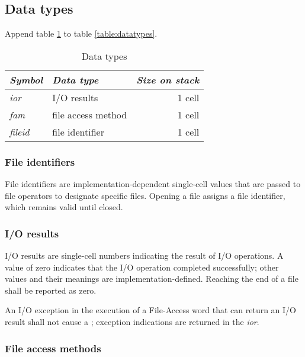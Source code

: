 \subsection{Data types} %

Append table \ref{file:types} to table \ref{table:datatypes}.

\begin{table}[h]
  \begin{center}
	\caption{Data types}
	\label{file:types}
	\begin{tabular}{llr}
	\hline\hline
	\emph{Symbol} & \emph{Data type} & \emph{Size on stack} \\
	\hline
	\emph{ior}		& I/O results			& 1 cell \\
	\emph{fam}		& file access method	& 1 cell \\
	\emph{fileid}	& file identifier		& 1 cell \\
	\hline\hline
	\end{tabular}
  \end{center}
\end{table}

\subsubsection{File identifiers} %

File identifiers are implementation-dependent single-cell values
that are passed to file operators to designate specific files.
Opening a file assigns a file identifier, which remains valid
until closed.

\subsubsection{I/O results} %
\label{file:ior}

I/O results are single-cell numbers indicating the result of I/O
operations. A value of zero indicates that the I/O operation
completed successfully; other values and their meanings are
implementation-defined. Reaching the end of a file shall be
reported as zero.

An I/O exception in the execution of a File-Access word that can
return an I/O result shall not cause a ;
exception indications are returned in the \emph{ior}.

\subsubsection{File access methods} %

